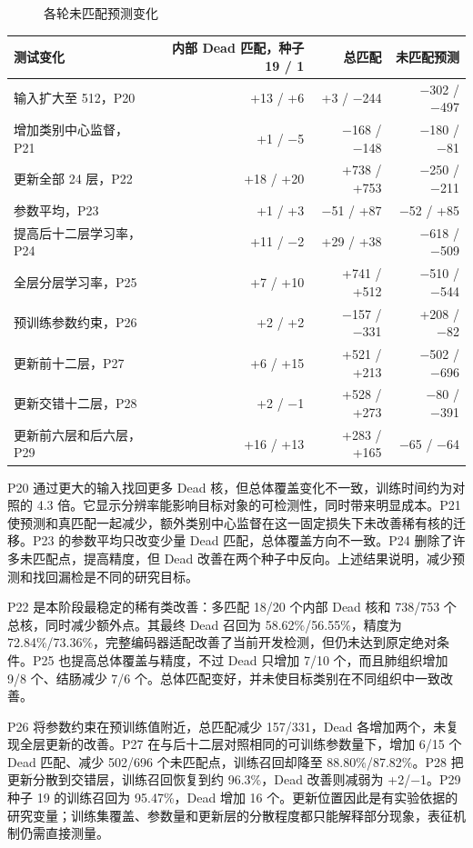 \documentclass[
  11pt,
  fontset=fandol]{ctexart}
\begin{document}
\begin{figure}[H]\centering

\caption{各轮未匹配预测变化}
\end{figure}

\begin{longtable}[]{@{}lrrr@{}}
\toprule\noalign{}
测试变化 & 内部 Dead 匹配，种子 19 / 1 & 总匹配 & 未匹配预测 \\
\midrule\noalign{}
\endhead
\bottomrule\noalign{}
\endlastfoot
输入扩大至 512，P20 & +13 / +6 & +3 / −244 & −302 / −497 \\
增加类别中心监督，P21 & +1 / −5 & −168 / −148 & −180 / −81 \\
更新全部 24 层，P22 & +18 / +20 & +738 / +753 & −250 / −211 \\
参数平均，P23 & +1 / +3 & −51 / +87 & −52 / +85 \\
提高后十二层学习率，P24 & +11 / −2 & +29 / +38 & −618 / −509 \\
全层分层学习率，P25 & +7 / +10 & +741 / +512 & −510 / −544 \\
预训练参数约束，P26 & +2 / +2 & −157 / −331 & +208 / −82 \\
更新前十二层，P27 & +6 / +15 & +521 / +213 & −502 / −696 \\
更新交错十二层，P28 & +2 / −1 & +528 / +273 & −80 / −391 \\
更新前六层和后六层，P29 & +16 / +13 & +283 / +165 & −65 / −64 \\
\end{longtable}

P20 通过更大的输入找回更多 Dead
核，但总体覆盖变化不一致，训练时间约为对照的 4.3
倍。它显示分辨率能影响目标对象的可检测性，同时带来明显成本。P21
使预测和真匹配一起减少，额外类别中心监督在这一固定损失下未改善稀有核的迁移。P23
的参数平均只改变少量 Dead 匹配，总体覆盖方向不一致。P24
删除了许多未匹配点，提高精度，但 Dead
改善在两个种子中反向。上述结果说明，减少预测和找回漏检是不同的研究目标。

P22 是本阶段最稳定的稀有类改善：多匹配 18/20 个内部 Dead 核和 738/753
个总核，同时减少额外点。其最终 Dead 召回为 58.62\%/56.55\%，精度为
72.84\%/73.36\%，完整编码器适配改善了当前开发检测，但仍未达到原定绝对条件。P25
也提高总体覆盖与精度，不过 Dead 只增加 7/10 个，而且肺组织增加 9/8
个、结肠减少 7/6 个。总体匹配变好，并未使目标类别在不同组织中一致改善。

P26 将参数约束在预训练值附近，总匹配减少 157/331，Dead
各增加两个，未复现全层更新的改善。P27
在与后十二层对照相同的可训练参数量下，增加 6/15 个 Dead 匹配、减少
502/696 个未匹配点，训练召回却降至 88.80\%/87.82\%。P28
把更新分散到交错层，训练召回恢复到约 96.3\%，Dead 改善则减弱为
+2/−1。P29 种子 19 的训练召回为 95.47\%，Dead 增加 16
个。更新位置因此是有实验依据的研究变量；训练集覆盖、参数量和更新层的分散程度都只能解释部分现象，表征机制仍需直接测量。
\end{document}
